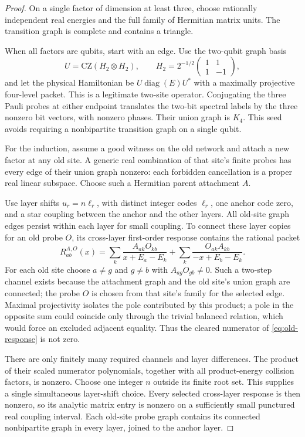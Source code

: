 \begin{proof}
On a single factor of dimension at least three, choose rationally
independent real energies and the full family of Hermitian matrix
units. The transition graph is complete and contains a triangle.

When all factors are qubits, start with an edge. Use the two-qubit
graph basis
\[
 U=\mathrm{CZ}(H_2\otimes H_2),\qquad
 H_2=2^{-1/2}\begin{pmatrix}1&1\\1&-1\end{pmatrix},
\]
and let the physical Hamiltonian be $U\operatorname{diag}(E)U^*$
with a maximally projective four-level packet. This is a legitimate
two-site operator. Conjugating the three Pauli probes at either
endpoint translates the two-bit spectral labels by the three
nonzero bit vectors, with nonzero phases. Their union graph is
$K_4$. This seed avoids requiring a nonbipartite transition graph
on a single qubit.

For the induction, assume a good witness on the old network and attach
a new factor at any old site. A generic real combination of that
site's finite probes has every edge of their union graph nonzero:
each forbidden cancellation is a proper real linear subspace.
Choose such a Hermitian parent attachment $A$.

Use layer shifts $u_r=n\ell_r$, with distinct integer codes $\ell_r$,
one anchor code zero, and a star coupling between the anchor and the
other layers. All old-site graph edges persist within each layer for
small coupling. To connect these layer copies for an old probe $O$,
its cross-layer first-order response contains the rational packet
\begin{equation}
 R_{ab}^{A,O}(x)=
 \sum_k\frac{A_{ak}O_{kb}}{x+E_a-E_k}
 +\sum_k\frac{O_{ak}A_{kb}}{-x+E_b-E_k}.
 \label{eq:old-response}
\end{equation}
For each old site choose $a\ne g$ and $g\ne b$ with
$A_{ag}O_{gb}\ne0$. Such a two-step channel exists because the attachment graph and the
old site's union graph are connected; the probe $O$ is chosen from that
site's family for the selected edge.
Maximal projectivity isolates the pole contributed by this product;
a pole in the opposite sum could coincide only through the trivial
balanced relation, which would force an excluded adjacent equality.
Thus the cleared numerator of \eqref{eq:old-response} is not zero.

There are only finitely many required channels and layer differences.
The product of their scaled numerator polynomials, together with all
product-energy collision factors, is nonzero. Choose one integer
$n$ outside its finite root set. This supplies a single simultaneous
layer-shift choice. Every selected cross-layer response is then
nonzero, so its analytic matrix entry is nonzero on a sufficiently
small punctured real coupling interval. Each old-site probe graph
contains its connected nonbipartite graph in every layer, joined to
the anchor layer.


\end{proof}
